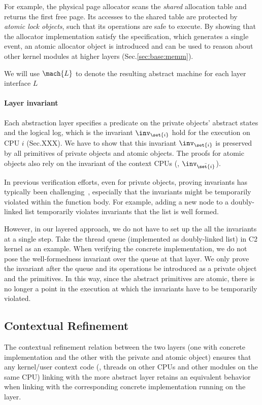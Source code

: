{For example, the physical page allocator scans the \emph{shared}
allocation table and returns the first free page.  Its accesses to the
shared table are protected by \emph{atomic lock objects}, such that
its  operations are safe to execute.  By showing that
the allocator implementation satisfy the specification, which
generates a single  event, an atomic allocator object is
introduced and can be used to reason about other kernel modules at
higher layers (\cf Sec.\ref{sec:base:memm}).

We will use $\mach{L}$ to denote the resulting abstract machine for
each layer interface $L$





\paragraph{Layer invariant}
Each abstraction layer specifies a predicate
on the private objects' abstract states
and the logical log,
which is the invariant $\inv_{\set{i}}$ hold for the execution on CPU $i$
(\cf Sec.XXX).
We have to show that this invariant $\inv_{\set{i}}$ is preserved
by all primitives of private objects and atomic objects.
The proofs for atomic  objects also rely on the
invariant of the context CPUs (\ie, $\inv_{\bar{\set{i}}}$).

In previous verification efforts, even for private objects,
proving invariants has typically been challenging~\cite{klein2009sel4},
especially that the invariants might be temporarily violated within the function body.
For example, adding a new node to a doubly-linked list
temporarily violates invariants that the list is well formed.

However, in our layered approach,
we do not have to set up the all the invariants at a single step.
Take the thread queue (implemented as doubly-linked list) in C2 kernel as an example.
When verifying the concrete implementation, we do not pose the well-formedness invariant
over the queue at that layer.
We only prove the invariant after the queue and its operations be introduced as a private object and the primitives.
In this way,
since the abstract primitives are atomic,
there is no longer a point in the execution
at which the invariants have to be temporarily violated.




\subsection{Contextual Refinement}
The contextual refinement relation between
the two layers (one with concrete implementation and the other
with the private and atomic object) ensures that any kernel/user context code 
(\ie, threads on other CPUs and other modules on the same CPU)
linking with the more abstract layer retains an
equivalent behavior when linking with the corresponding
concrete implementation running on the layer.

}
